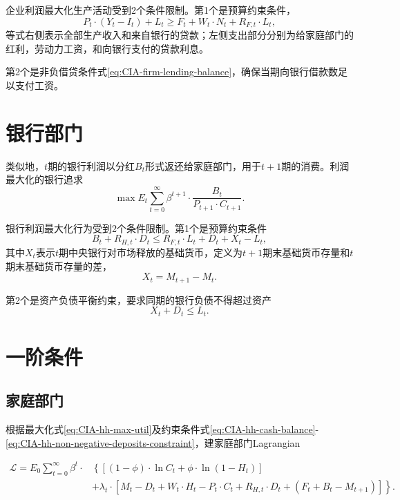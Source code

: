 企业利润最大化生产活动受到2个条件限制。第1个是预算约束条件，
\begin{equation}
  \label{eq:CIA-firm-budget-constraint}
  P_t \cdot (Y_t-I_t) + L_t \ge F_t + W_t \cdot N_t + R_{F,t} \cdot L_t,
\end{equation}
等式右侧表示全部生产收入和来自银行的贷款；左侧支出部分分别为给家庭部门的红利，劳动力工资，和向银行支付的贷款利息。

第2个是非负借贷条件式\eqref{eq:CIA-firm-lending-balance}，确保当期向银行借款数足以支付工资。

\section{银行部门}
类似地，$t$期的银行利润以分红$B_t$形式返还给家庭部门，用于$t+1$期的消费。利润最大化的银行追求
\begin{equation}
  \label{eq:CIA-bank-max-problem}
  \max E_t \sum_{t=0}^{\infty} \beta^{t+1} \cdot \frac{B_{t}}{P_{t+1} \cdot C_{t+1}}.
\end{equation}

银行利润最大化行为受到2个条件限制。第1个是预算约束条件
\begin{equation}
  \label{eq:CIA-bank-budget-constraint}
  B_t + R_{H,t} \cdot D_t \le R_{F,t} \cdot L_t + D_t + X_t - L_t,
\end{equation}
其中$X_t$表示$t$期中央银行对市场释放的基础货币，定义为$t+1$期末基础货币存量和$t$期末基础货币存量的差，
\begin{equation}
  \label{eq:CIA-central-bank-money-injection}
  X_t = M_{t+1} - M_t.
\end{equation}

第2个是资产负债平衡约束，要求同期的银行负债不得超过资产
\begin{equation}
  \label{eq:CIA-bank-balance-sheet}
  X_t + D_t \le L_t.
\end{equation}

\section{一阶条件}
\subsection{家庭部门}
根据最大化式\eqref{eq:CIA-hh-max-util}及约束条件式\eqref{eq:CIA-hh-cash-balance}-\eqref{eq:CIA-hh-non-negative-deposits-constraint}，建家庭部门Lagrangian

\begin{align*}
  \mathcal{L} = E_0 \sum_{t=0}^{\infty} \beta^t \cdot & \left\{
\left[(1-\phi) \cdot \ln C_t + \phi \cdot \ln (1-H_t)\right]
   \right. \\
   & \left. + \lambda_t \cdot
   \left[
M_t - D_t + W_t \cdot H_t - P_t \cdot C_t + R_{H,t} \cdot D_t + \left( F_t + B_t - M_{t+1} \right)
   \right]\right\}.
\end{align*}

